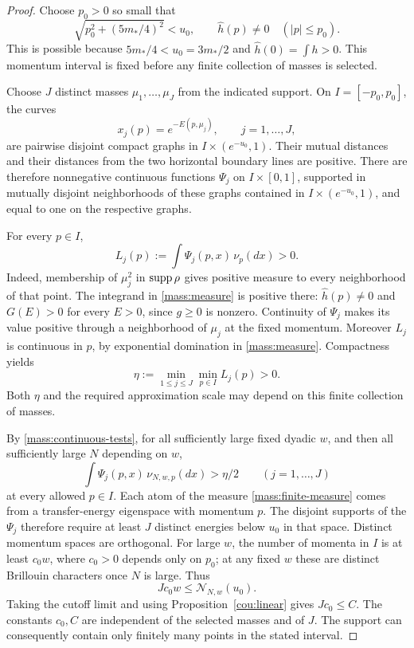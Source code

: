 \begin{proof}
Choose $p_0>0$ so small that
\[
 \sqrt{p_0^2+(5m_*/4)^2}<u_0,
 \qquad \widehat h(p)\ne0\quad (|p|\le p_0).
\]
This is possible because $5m_*/4<u_0=3m_*/2$ and
$\widehat h(0)=\int h>0$. This momentum interval is fixed before any
finite collection of masses is selected.

Choose $J$ distinct masses $\mu_1,\ldots,\mu_J$ from the indicated
support. On $I=[-p_0,p_0]$, the curves
\[
 x_j(p)=e^{-E(p,\mu_j)},\qquad j=1,\ldots,J,
\]
are pairwise disjoint compact graphs in $I\times(e^{-u_0},1)$. Their
mutual distances and their distances from the two horizontal boundary
lines are positive. There are therefore nonnegative continuous functions
$\Psi_j$ on $I\times[0,1]$, supported in mutually disjoint neighborhoods
of these graphs contained in $I\times(e^{-u_0},1)$, and equal to one on
the respective graphs.

For every $p\in I$,
\[
 L_j(p):=\int\Psi_j(p,x)\,\nu_p(dx)>0.
\]
Indeed, membership of $\mu_j^2$ in $\operatorname{supp}\rho$ gives positive measure to
every neighborhood of that point. The integrand in \eqref{mass:measure}
is positive there: $\widehat h(p)\ne0$ and $G(E)>0$ for every $E>0$,
since $g\ge0$ is nonzero. Continuity of $\Psi_j$ makes its value positive
through a neighborhood of $\mu_j$ at the fixed momentum. Moreover
$L_j$ is continuous in $p$, by exponential domination in
\eqref{mass:measure}. Compactness yields
\[
 \eta:=\min_{1\le j\le J}\min_{p\in I}L_j(p)>0.
\]
Both $\eta$ and the required approximation scale may depend on this
finite collection of masses.

By \eqref{mass:continuous-tests}, for all sufficiently large fixed
dyadic $w$, and then all sufficiently large $N$ depending on $w$,
\[
 \int\Psi_j(p,x)\,\nu_{N,w,p}(dx)>\eta/2
 \qquad (j=1,\ldots,J)
\]
at every allowed $p\in I$. Each atom of the measure
\eqref{mass:finite-measure} comes from a transfer-energy eigenspace
with momentum $p$. The disjoint
supports of the $\Psi_j$ therefore require at least $J$ distinct energies
below $u_0$ in that space. Distinct momentum spaces are orthogonal.
For large $w$, the number of momenta in $I$ is at least
$c_0w$, where $c_0>0$ depends only on $p_0$; at any fixed $w$ these are
distinct Brillouin characters once $N$ is large. Thus
\[
 Jc_0w\le\mathcal N_{N,w}(u_0).
\]
Taking the cutoff limit and using Proposition~\ref{cou:linear} gives
$Jc_0\le C$. The constants $c_0,C$ are independent of the selected
masses and of $J$. The support can consequently contain only finitely
many points in the stated interval.
\end{proof}

